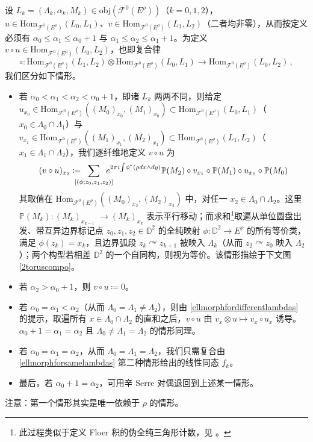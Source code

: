 \begin{Def}
	设 $L_k=(\Lambda_k,\alpha_k,M_k)\in\text{obj}(\mathscr{F}^0(E^\rho))$（$k=0,1,2$），$u\in\text{Hom}_{\mathscr{F}^0(E^\rho)}(L_0,L_1)$、$v\in\text{Hom}_{\mathscr{F}^0(E^\rho)}(L_1,L_2)$（二者均非零），从而按定义必须有 $\alpha_0\leq\alpha_1\leq \alpha_0+1$ 与 $\alpha_1\leq\alpha_2\leq \alpha_1+1$。为定义 $v\circ u\in\text{Hom}_{\mathscr{F}^0(E^\rho)}(L_0,L_2)$，也即复合律
	\[
	\circ:\text{Hom}_{\mathscr{F}^0(E^\rho)}(L_1,L_2)\otimes\text{Hom}_{\mathscr{F}^0(E^\rho)}(L_0,L_1)\rightarrow \text{Hom}_{\mathscr{F}^0(E^\rho)}(L_0,L_2)\,,
	\]
	我们区分如下情形。
	\begin{itemize}[leftmargin=0.5cm]
		\renewcommand{\labelitemi}{\textendash}
		\item 若 $\alpha_0<\alpha_1<\alpha_2 < \alpha_0+1$，即诸 $L_k$ 两两不同，则给定 $u_{x_0}\in\text{Hom}_{\mathscr{F}^0(E^\rho)}((M_0)_{x_0},(M_1)_{x_0})\subset\text{Hom}_{\mathscr{F}^0(E^\rho)}(L_0,L_1)$（$x_0\in\Lambda_0\cap\Lambda_1$）与 $v_{x_1}\in\text{Hom}_{\mathscr{F}^0(E^\rho)}((M_1)_{x_1},(M_2)_{x_1})\subset\text{Hom}_{\mathscr{F}^0(E^\rho)}(L_1,L_2)$（$x_1\in\Lambda_1\cap\Lambda_2$），我们逐纤维地定义 $v\circ u$ 为
		\begin{equation}
			(v\circ u)_{x_2}\coloneqq\mkern-18mu\sum_{[(\phi;z_0,z_1,z_2)]}\mkern-18mu e^{2\pi i\!\int\!\phi^*(\rho dx\wedge dy)}\mathbb{P}(M_2)\circ v_{x_1}\circ\mathbb{P}(M_1)\circ u_{x_0}\circ\mathbb{P}(M_0)
		\end{equation}
		其取值在 $\text{Hom}_{\mathscr{F}^0(E^\rho)}((M_0)_{x_2},(M_2)_{x_2})$ 中，对任一 $x_2\in \Lambda_0\cap\Lambda_2$。这里 $\mathbb{P}(M_k):(M_k)_{x_{k-1}}$ $\rightarrow (M_k)_{x_k}$ 表示平行移动；而求和\footnote{此过程类似于定义 Floer 积的伪全纯三角形计数，见 \cite[第 6.1 节]{[Imp21]}。}取遍从单位圆盘出发、带互异边界标记点 $z_0,z_1,z_2\in\mathbb{D}^2$ 的全纯映射 $\phi:\mathbb{D}^2\rightarrow E^\rho$ 的所有等价类，满足 $\phi(z_k)=x_k$，且边界弧段 $z_k\!\curvearrowright\! z_{k+1}$ 被映入 $\Lambda_k$（从而 $z_2\!\curvearrowright\! z_0$ 映入 $\Lambda_2$）；两个构型若相差 $\mathbb{D}^2$ 的一个自同构，则视为等价。该情形描绘于下文图 \ref{2toruscompo}。

		\item 若 $\alpha_2>\alpha_0+1$，则 $v\circ u\coloneqq 0$。

		\item 若 $\alpha_0=\alpha_1<\alpha_2$（从而 $\Lambda_0=\Lambda_1\neq\Lambda_2$），则由 \eqref{ellmorphfordifferentlambdas} 的提示，取遍所有 $x\in\Lambda_0\cap\Lambda_2$ 的直和之后，$v\circ u$ 由 $v_x\otimes u\mapsto v_x\circ u_x$ 诱导。$\alpha_0+1=\alpha_1=\alpha_2$ 且 $\Lambda_0\neq\Lambda_1=\Lambda_2$ 的情形同理。

		\item 若 $\alpha_0=\alpha_1=\alpha_2$，从而 $\Lambda_0=\Lambda_1=\Lambda_2$，我们只需复合由 \eqref{ellmorphforsamelambdas} 第二种情形给出的线性同态 $f_k$。

		\item 最后，若 $\alpha_0+1=\alpha_2$，可用辛 Serre 对偶退回到上述某一情形。
	\end{itemize}
	注意：第一个情形其实是唯一依赖于 $\rho$ 的情形。	
\end{Def}

